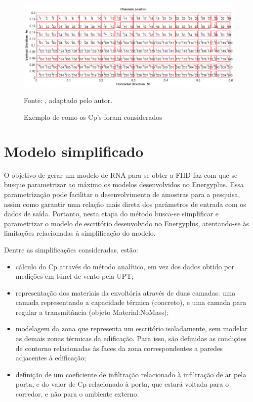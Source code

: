 \documentclass[brazil,hardcopy,openany,a5paper]{ufscthesis}
\begin{document}
		\begin{figure}[h]
			\centering
			\caption{Exemplo de como os Cp’s foram considerados}
			\includegraphics[width=1\linewidth]{img/tpu_windows.png}
			\label{fig:tpuwindows}
			\begin{flushleft}
				Fonte:  \cite{TPU2018}, adaptado pelo autor.
			\end{flushleft}
		\end{figure}
		
		
		\section{Modelo simplificado}
		
		O objetivo de gerar um modelo de RNA para se obter a FHD faz com que se busque parametrizar ao máximo os modelos desenvolvidos no Energyplus. Essa parametrização pode facilitar o desenvolvimento de amostras para a pesquisa, assim como garantir uma relação mais direta dos parâmetros de entrada com os dados de saída. Portanto, nesta etapa do método busca-se simplificar e parametrizar o modelo de escritório desenvolvido no Energyplus, atentando-se às limitações relacionadas à simplificação do modelo.
		
		Dentre as simplificações consideradas, estão:
		
		\begin{itemize}
		\item cálculo do Cp através do método analítico, em vez dos dados obtido por medições em túnel de vento pela UPT;
		\item representação dos materiais da envoltória através de duas camadas: uma camada representando a capacidade térmica (concreto), e uma camada para regular a transmitância (objeto Material:NoMass);
		\item modelagem da zona que representa um escritório isoladamente, sem modelar as demais zonas térmicas da edificação. Para isso, são definidas as condições de contorno relacionadas às faces da zona correspondentes a paredes adjacentes à edificação;
		\item definição de um coeficiente de infiltração relacionado à infiltração de ar pela porta, e do valor de Cp relacionado à porta, que estará voltada para o corredor, e não para o ambiente externo.
		\end{itemize}
		
\end{document}

